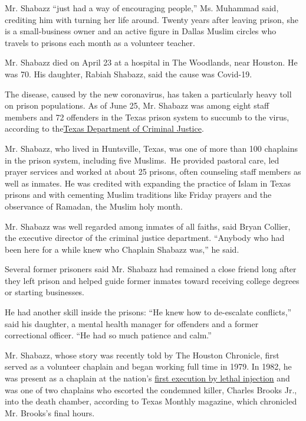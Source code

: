 Mr. Shabazz ``just had a way of encouraging people,'' Ms. Muhammad said,
crediting him with turning her life around. Twenty years after leaving
prison, she is a small-business owner and an active figure in Dallas
Muslim circles who travels to prisons each month as a volunteer teacher.

Mr. Shabazz died on April 23 at a hospital in The Woodlands, near
Houston. He was 70. His daughter, Rabiah Shabazz, said the cause was
Covid-19.

The disease, caused by the new coronavirus, has taken a particularly
heavy toll on prison populations. As of June 25, Mr. Shabazz was among
eight staff members and 72 offenders in the Texas prison system to
succumb to the virus, according to
the\href{https://www.tdcj.texas.gov/}{Texas Department of Criminal
Justice}.

Mr. Shabazz, who lived in Huntsville, Texas, was one of more than 100
chaplains in the prison system, including five Muslims.~He provided
pastoral care, led prayer services and worked at about 25 prisons, often
counseling staff members as well as inmates. He was credited with
expanding the practice of Islam in Texas prisons and with cementing
Muslim traditions like Friday prayers and the observance of Ramadan, the
Muslim holy month.

Mr. Shabazz was well regarded among inmates of all faiths, said Bryan
Collier, the executive director of the criminal justice department.
``Anybody who had been here for a while knew who Chaplain Shabazz was,''
he said.

Several former prisoners said Mr. Shabazz had remained a close friend
long after they left prison and helped guide former inmates toward
receiving college degrees or starting businesses.

He had another skill inside the prisons: ``He knew how to de-escalate
conflicts,'' said his daughter, a mental health manager for offenders
and a former correctional officer. ``He had so much patience and calm.''

Mr. Shabazz, whose story was recently told by The Houston Chronicle,
first served as a volunteer chaplain and began working full time in
1979. In 1982, he was present as a chaplain at the nation's
\href{https://www.nytimes.com/1982/12/07/us/technician-executes-murderer-in-texas-by-lethal-injection.html}{first
execution by lethal injection} and was one of two chaplains who escorted
the condemned killer, Charles Brooks Jr., into the death chamber,
according to Texas Monthly magazine, which chronicled Mr. Brooks's final
hours.


